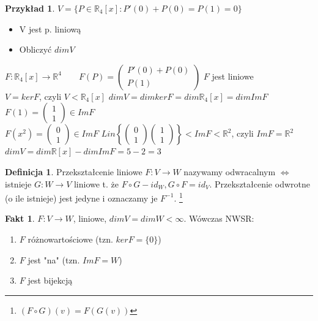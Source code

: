 \documentclass[12pt,a4paper]{article}
\newcommand{\RR}{\mathbb{R}}
\theoremstyle{plain}
\theoremstyle{definition}
\newtheorem{ft}{Fakt}[section]
\theoremstyle{definition}
\newtheorem{df}{Definicja}[section]
\theoremstyle{definition}
\theoremstyle{definition}
\theoremstyle{definition}
\theoremstyle{definition}
\newtheorem*{prz}{Przykład}
\theoremstyle{definition}
\theoremstyle{definition}
\theoremstyle{definition}
\begin{document}
\begin{prz}
    $ V = \{ P \in \RR_4[x] : P'(0) + P(0) = P(1) = 0 \}$ 
    \begin{itemize}
        \item V jest p. liniową
        \item Obliczyć $dim V$
    \end{itemize}
    $ F : \RR_4[x] \rightarrow \RR^4 
        \qquad F(P) = \begin{pmatrix} P'(0) + P(0) \\ P(1) \end{pmatrix} $ \quad $F$ jest liniowe \\
    $V = ker F$, czyli $V < \RR_4[x]$
    $dim V = dimker F = dim\RR_4 [x] = dimImF$ %
    $F(1) = \begin{pmatrix} 1 \\ 1 \end{pmatrix} \in Im F$ \\
    $F(x^2) = \begin{pmatrix} 0 \\ 1 \end{pmatrix} \in Im F$
    $Lin \left\{ \begin{pmatrix} 0 \\ 1 \end{pmatrix} \begin{pmatrix} 1 \\ 1 \end{pmatrix} \right\} < Im F < \RR^2 $, czyli
    $Im F = \RR^2$ \\%
    $dimV = dim\RR[x] - dimImF = 5 - 2 = 3$
\end{prz}

\begin{df} 
    Przekształcenie liniowe $F: V \rightarrow W $ nazywamy odwracalnym $\Leftrightarrow$ istnieje $G: W \rightarrow V$ liniowe t. że $F \circ G - id_W, G \circ F = id_V.$ Przekształcenie odwrotne (o ile istnieje) jest jedyne i oznaczamy je $F^{-1}$. \footnote{$(F \circ G)(v) = F(G(v))$}
\end{df}

\begin{ft} $F: V \rightarrow W $, liniowe, $dim V = dimW < \infty$. Wówczas NWSR:
    \begin{enumerate}[{(}1{)}]
        \item $F$ różnowartościowe (tzn. $kerF = \{0\}$)
        \item $F$ jest "na" (tzn. $Im F = W$)
        \item $F$ jest bijekcją
    \end{enumerate}
\end{ft}
\end{document}
